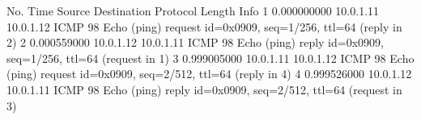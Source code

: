No.     Time           Source                Destination           Protocol Length Info
      1 0.000000000    10.0.1.11             10.0.1.12             ICMP     98     Echo (ping) request  id=0x0909, seq=1/256, ttl=64 (reply in 2)
      2 0.000559000    10.0.1.12             10.0.1.11             ICMP     98     Echo (ping) reply    id=0x0909, seq=1/256, ttl=64 (request in 1)
      3 0.999005000    10.0.1.11             10.0.1.12             ICMP     98     Echo (ping) request  id=0x0909, seq=2/512, ttl=64 (reply in 4)
      4 0.999526000    10.0.1.12             10.0.1.11             ICMP     98     Echo (ping) reply    id=0x0909, seq=2/512, ttl=64 (request in 3)
